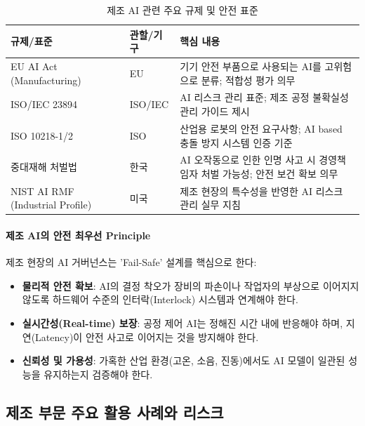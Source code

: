 \begin{table}[htbp]
\centering
\caption{제조 AI 관련 주요 규제 및 안전 표준}
\label{tab:manufacturing_regulations}
\begin{tabularx}{\textwidth}{p{3.5cm}p{2.5cm}X}
\toprule
\textbf{규제/표준} & \textbf{관할/기구} & \textbf{핵심 내용} \\
\midrule
EU AI Act (Manufacturing) & EU & 기기 안전 부품으로 사용되는 AI를 고위험으로 분류; 적합성 평가 의무 \\
\midrule
ISO/IEC 23894 & ISO/IEC & AI 리스크 관리 표준; 제조 공정 불확실성 관리 가이드 제시 \\
\midrule
ISO 10218-1/2 & ISO & 산업용 로봇의 안전 요구사항; AI based 충돌 방지 시스템 인증 기준 \\
\midrule
중대재해 처벌법 & 한국 & AI 오작동으로 인한 인명 사고 시 경영책임자 처벌 가능성; 안전 보건 확보 의무 \\
\midrule
NIST AI RMF (Industrial Profile) & 미국 & 제조 현장의 특수성을 반영한 AI 리스크 관리 실무 지침 \\
\bottomrule
\end{tabularx}
\end{table}

\paragraph{제조 AI의 안전 최우선 Principle}
제조 현장의 AI 거버넌스는 'Fail-Safe' 설계를 핵심으로 한다:
\begin{itemize}
 \item \textbf{물리적 안전 확보}: AI의 결정 착오가 장비의 파손이나 작업자의 부상으로 이어지지 않도록 하드웨어 수준의 인터락(Interlock) 시스템과 연계해야 한다.
 \item \textbf{실시간성(Real-time) 보장}: 공정 제어 AI는 정해진 시간 내에 반응해야 하며, 지연(Latency)이 안전 사고로 이어지는 것을 방지해야 한다.
 \item \textbf{신뢰성 및 가용성}: 가혹한 산업 환경(고온, 소음, 진동)에서도 AI 모델이 일관된 성능을 유지하는지 검증해야 한다.
\end{itemize}


\subsection{제조 부문 주요 활용 사례와 리스크}
\label{sec:5.4.2}

